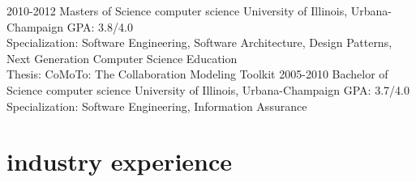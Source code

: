 \documentclass{friggeri-cv} %
\begin{document}
\begin{entrylist}
\entry
{2010-2012}
{Masters of Science {\normalfont computer science}}
{University of Illinois, Urbana-Champaign}
{GPA: 3.8/4.0 \\
Specialization: Software Engineering, Software Architecture, Design Patterns, Next Generation Computer Science Education \\ 
Thesis: CoMoTo: The Collaboration Modeling Toolkit }
\entry
{2005-2010}
{Bachelor of Science {\normalfont computer science}}
{University of Illinois, Urbana-Champaign}
{GPA: 3.7/4.0 \\
Specialization: Software Engineering, Information Assurance}
\end{entrylist}

\pagebreak
\section{industry experience}
\end{document}
